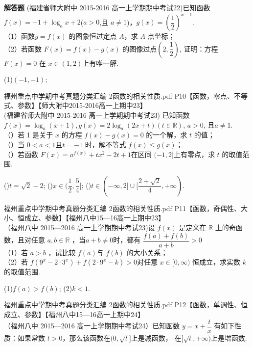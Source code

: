 \begin{exercise}{\bf 解答题}
      (福建省师大附中 2015-2016 高一上学期期中考试22)已知函数$f(x)=-1+\log_a{x+2}$($a>0$,且 $a \neq1$)，$g(x)=(\dfrac12)^{x-1}$.\\
     （1）函数$ y= f (x )$ 的图象恒过定点 $A$，求 $A$ 点坐标；\\
     （2）若函数 $F ( x )= f ( x )- g ( x )$ 的图像过点$(2,\dfrac12)$, 证明：方程 $F ( x )= 0$ 在 $x\in(1,2)$上有唯一解.
     \begin{answer}
       (1)$(-1,-1)$;
     \end{answer}
    \item 福州重点中学期中考真题分类汇编 2函数的相关性质.pdf P10【函数，零点、不等式、参数】【师大附中2015-2016高一上期中23】\\
     (福建省师大附中 2015-2016 高一上学期期中考试23) 已知函数 $f ( x ) =\log_a ( x+ 1), g ( x )= 2 \log_a ( 2 x+ t )(t\in \mathbb{R})$, $a> 0$, 且$a\neq 1$.\\
     （）若 1 是关于 $x$ 的方程 $f ( x) -g ( x) =0$ 的一个解，求 $t$ 的值；\\
     （）当 $0< a< 1$且$t=-1$ 时，解不等式 $f ( x)\leq g ( x) $；\\
     （）若函数 $F ( x)= a^{f ( x ) }+ tx^2- 2t+ 1 $在区间 $(-1,2]$上有零点，求 $t$ 的取值范围.
     \begin{answer}
      ()$t=\sqrt{2}-2$;
      ()$x\in(\dfrac12,\dfrac54]$;
      ()$t\in(-\infty,2]\cup [\dfrac{2+\sqrt{2}}{4},+\infty)$.
     \end{answer}
    \item 福州重点中学期中考真题分类汇编 2函数的相关性质.pdf P11【函数，奇偶性、大小、恒成立、参数】【福州八中15—16高一上期中23】\\
     （福州八中 2015—2016 高一上学期期中考试23)设 $f (x )$ 是定义在 $\mathbb{R}$ 上的奇函数，且对任意 $a,b\in \mathbb{R}$ ，当$a+b\neq0$时，都有 $\dfrac{f(a)+f(b)}{a+b}>0$\\
     （1）若 $a> b$ ，试比较 $f (a ) $与 $f (b)$ 的大小关系；\\
     （2）若 $f (9^x- 2\cdot 3^x )+ f ( 2\cdot 9^x-k )> 0 $对任意 $x\in[0,\infty )$ 恒成立，求实数 $k$ 的取值范围.
     \begin{answer}
      (1)$f(a)>f(b)$;
      (2)$k<1$.
     \end{answer}
    \item 福州重点中学期中考真题分类汇编 2函数的相关性质.pdf P12【函数，单调性、恒成立、参数】【福州八中15—16高一上期中24】\\
     （福州八中 2015—2016 高一上学期期中考试24）已知函数 $y=x+\dfrac tx$ 有如下性质：如果常数 $t>0$，那么该函数在$(0,\sqrt t]$上是减函数， 在$[\sqrt t, +\infty)$上是增函数.\\

\end{exercise}
